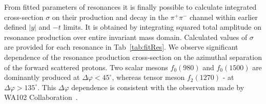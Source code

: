From fitted parameters of resonances it is finally possible to calculate integrated cross-section $\sigma$ on their production and decay in the $\pi^{+}\pi^{-}$ channel within earlier defined $|y|$ and $-t$ limits. It is obtained by integrating squared total amplitude on resonance production over entire invariant mass domain. Calculated values of $\sigma$ are provided for each resonance in Tab~\ref{tab:fitRes}. We observe significant dependence of the resonance production cross-section on the azimuthal separation of the forward scattered protons. Two scalar mesons $f_{0}(980)$ and $f_{0}(1500)$ are dominantly produced at $\Delta\varphi<45^{\circ}$, whereas tensor meson $f_{2}(1270)$ - at $\Delta\varphi>135^{\circ}$. This $\Delta\varphi$ dependence is consistent with the observation made by WA102 Collaboration~\cite{WA102}.




% 

